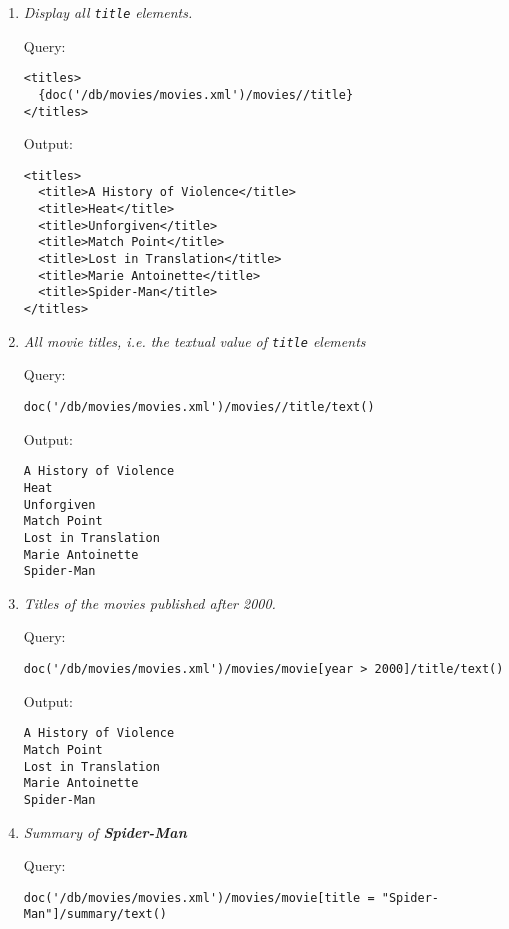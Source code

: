 \documentclass[a4paper, notitlepage]{article}
\begin{document}
\begin{enumerate}
\item 
  \emph{Display all \lstinline{title} elements.} 
  
Query: 
  
\begin{lstlisting}
<titles>
  {doc('/db/movies/movies.xml')/movies//title}
</titles>
\end{lstlisting}
  
Output:
  
\begin{lstlisting}
<titles>
  <title>A History of Violence</title>
  <title>Heat</title>
  <title>Unforgiven</title>
  <title>Match Point</title>
  <title>Lost in Translation</title>
  <title>Marie Antoinette</title>
  <title>Spider-Man</title>
</titles>
\end{lstlisting}
  
\item 
  \emph{All movie titles, i.e. the textual value of \lstinline{title} elements} 
  
Query: 
  
\begin{lstlisting}
doc('/db/movies/movies.xml')/movies//title/text()
\end{lstlisting}
  
Output:
  
\begin{lstlisting}
A History of Violence
Heat
Unforgiven
Match Point
Lost in Translation
Marie Antoinette
Spider-Man
\end{lstlisting}  

\item 
  \emph{Titles of the movies published after 2000.} 
  
Query: 
  
\begin{lstlisting}
doc('/db/movies/movies.xml')/movies/movie[year > 2000]/title/text()
\end{lstlisting}
  
Output:
  
\begin{lstlisting}
A History of Violence
Match Point
Lost in Translation
Marie Antoinette
Spider-Man
\end{lstlisting}  

\item 
  \emph{Summary of \textbf{Spider-Man}} 
  
Query: 
  
\begin{lstlisting}
doc('/db/movies/movies.xml')/movies/movie[title = "Spider-Man"]/summary/text()
\end{lstlisting}
  

\end{enumerate}
\end{document}
